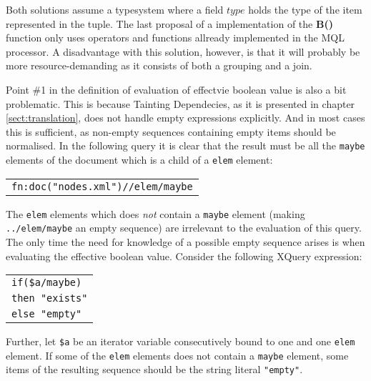 Both solutions assume a typesystem where a field $type$ holds the type of the item represented in the tuple. The
last proposal of a implementation of the \textbf{B()} function only uses operators and functions allready
implemented in the MQL processor. A disadvantage with this solution, however, is that it will probably be more
resource-demanding as it consists of both a grouping and a join.

Point \#1 in the definition of evaluation of effectvie boolean value is also a bit problematic. This is because
Tainting Dependecies, as it is presented in chapter \ref{sect:translation}, does not handle empty expressions
explicitly. And in most cases this is sufficient, as non-empty sequences containing empty items should be
normalised. In the following query it is clear that the result must be all the \texttt{maybe} elements of the
document which is a child of a \texttt{elem} element:

\begin{center}
\begin{tabular}{l}
\texttt{fn:doc("nodes.xml")//elem/maybe}
\end{tabular}
\end{center}

The \texttt{elem} elements which does \emph{not} contain a \texttt{maybe} element (making \texttt{../elem/maybe}
an empty sequence) are irrelevant to the evaluation of this query. The only time the need for knowledge of a
possible empty sequence arises is when evaluating the effective boolean value. Consider the following XQuery
expression:

\begin{center}
\begin{tabular}{l}
\texttt{if(\$a/maybe)} \\ \quad
\texttt{then "exists"} \\ \quad
\texttt{else "empty"}
\end{tabular}
\end{center}

Further, let \texttt{\$a} be an iterator variable consecutively bound to one and one \texttt{elem} element. If
some of the \texttt{elem} elements does not contain a \texttt{maybe} element, some items of the resulting sequence
should be the string literal \texttt{"empty"}.

